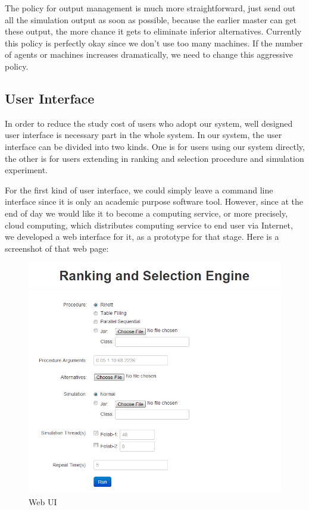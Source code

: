 The policy for output management is much more straightforward, just send out all the simulation output as soon as possible, because the earlier master can get these output, the more chance it gets to eliminate inferior alternatives. Currently this policy is perfectly okay since we don't use too many machines. If the number of agents or machines increases dramatically, we need to change this aggressive policy.

\subsection{User Interface}

In order to reduce the study cost of users who adopt our system, well designed user interface is necessary part in the whole system. In our system, the user interface can be divided into two kinds. One is for users using our system directly, the other is for users extending in ranking and selection procedure and simulation experiment.

For the first kind of user interface, we could simply leave a command line interface since it is only an academic purpose software tool. However, since at the end of day we would like it to become a computing service, or more precisely, cloud computing, which distributes computing service to end user via Internet, we developed a web interface for it, as a prototype for that stage. Here is a screenshot of that web page:

\begin{figure}[ht] \label{web-ui}
\centering
\includegraphics[width=120mm]{rase_web.png}
\caption{Web UI}
\end{figure}

